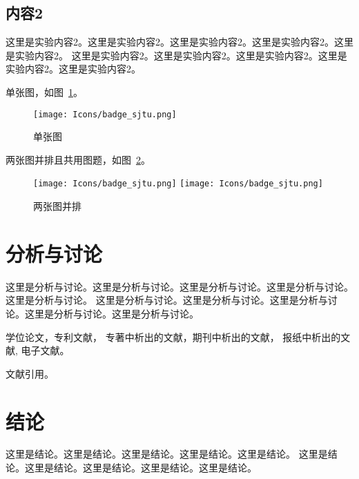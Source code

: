 \subsection{内容2}

这里是实验内容2。这里是实验内容2。这里是实验内容2。这里是实验内容2。这里是实验内容2。
这里是实验内容2。这里是实验内容2。这里是实验内容2。这里是实验内容2。这里是实验内容2。

单张图，如图~\ref{fig:single-figure}。
\begin{figure}[!htp]
    \centering
    \texttt{[image: Icons/badge\_sjtu.png]}
    \caption{单张图}
    \label{fig:single-figure}
\end{figure}


两张图并排且共用图题，如图~\ref{fig:two-figures}。
\begin{figure}[!htp]
    \centering
    \texttt{[image: Icons/badge\_sjtu.png]}
    \hspace{1cm}
    \texttt{[image: Icons/badge\_sjtu.png]}
    \caption{两张图并排}
    \label{fig:two-figures}
\end{figure}


\section{分析与讨论}

这里是分析与讨论。这里是分析与讨论。这里是分析与讨论。这里是分析与讨论。这里是分析与讨论。
这里是分析与讨论。这里是分析与讨论。这里是分析与讨论。这里是分析与讨论。这里是分析与讨论。

学位论文\cite{Zhang1998}，专利文献\cite{Jiang1989,HBLZ2001}，
专著中析出的文献\cite{Cheng1999,GBT2659}，期刊中析出的文献\cite{Li1999,Li2000}，
报纸中析出的文献\cite{Ding2000}, 电子文献\cite{Jiang1999,Christine1998,Xiao2001}。

文献引用\cite{Zhang1998,Jiang1999,Christine1998,Xiao2001}。


\section{结论}

这里是结论。这里是结论。这里是结论。这里是结论。这里是结论。
这里是结论。这里是结论。这里是结论。这里是结论。这里是结论。

\newpage
